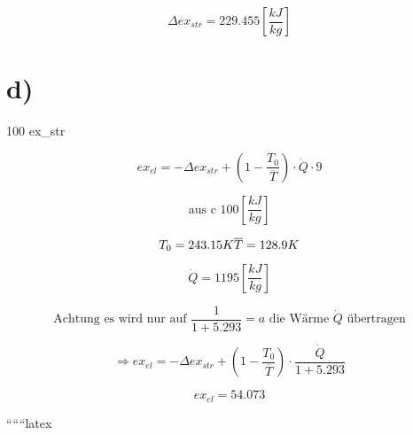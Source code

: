 \[
\boxed{\Delta ex_{str} = 229.455 \left[ \frac{kJ}{kg} \right]}
\]

\section*{d)}

 100   \Delta ex_{str}

\[
ex_{el} = -\Delta ex_{str} + \left( 1 - \frac{T_0}{\overline{T}} \right) \cdot \dot{Q} \cdot 9
\]

\[
\text{aus c } 100 \left[ \frac{kJ}{kg} \right]
\]

\[
T_0 = 243.15 K \\
\overline{T} = 128.9 K
\]

\[
\dot{Q} = 1195 \left[ \frac{kJ}{kg} \right]
\]

\[
\text{Achtung es wird nur auf } \frac{1}{1 + 5.293} = a \text{ die W\"arme } \dot{Q} \text{ \"ubertragen}
\]

\[
\Rightarrow ex_{el} = -\Delta ex_{str} + \left( 1 - \frac{T_0}{\overline{T}} \right) \cdot \frac{\dot{Q}}{1 + 5.293}
\]

\[
\boxed{ex_{el} = 54.073}
\]

``````latex


